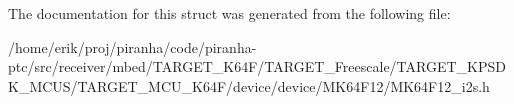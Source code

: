 The documentation for this struct was generated from the following file\+:\begin{DoxyCompactItemize}
\item 
/home/erik/proj/piranha/code/piranha-\/ptc/src/receiver/mbed/\+T\+A\+R\+G\+E\+T\+\_\+\+K64\+F/\+T\+A\+R\+G\+E\+T\+\_\+\+Freescale/\+T\+A\+R\+G\+E\+T\+\_\+\+K\+P\+S\+D\+K\+\_\+\+M\+C\+U\+S/\+T\+A\+R\+G\+E\+T\+\_\+\+M\+C\+U\+\_\+\+K64\+F/device/device/\+M\+K64\+F12/M\+K64\+F12\+\_\+i2s.\+h\end{DoxyCompactItemize}
